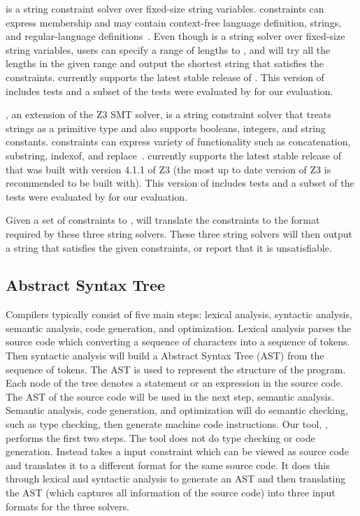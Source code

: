 \hampi is a string constraint solver over fixed-size string variables. \hampi constraints can express
membership and may contain context-free language definition, strings, and regular-language
definitions~\cite{hampi2009}. Even though \hampi is a string solver over fixed-size string variables,
users can specify a range of lengths to \hampi, and \hampi will try all the lengths in the given range
and output the shortest string that satisfies the constraints.
\imss currently supports the latest stable release of \hampi. This version of \hampi
includes \hampitests tests and a subset of the \hampitests tests were evaluated by \imss for our evaluation.

\zstr, an extension of the Z3 SMT solver, is a string constraint solver that treats strings
as a primitive type and also supports booleans, integers, and string constants.
\zstr constraints can express variety of functionality such as concatenation, substring,
indexof, and replace~\cite{z32013}.
\imss currently supports the latest stable release of \zstr that was built with version
4.1.1 of Z3 (the most up to date version of Z3 \zstr is recommended to be built with).
This version of \zstr
includes \ztests tests and a subset of the \ztests tests were evaluated by \imss for our evaluation.

Given a set of constraints to \imss, \imss will translate the constraints to the format required by these three string solvers. These three string solvers will then output a string that satisfies the given constraints, or report that it is unsatisfiable.

\subsection{Abstract Syntax Tree}
Compilers typically consist of five main steps: lexical analysis, syntactic analysis, semantic
analysis, code generation, and optimization. Lexical analysis parses the source code which converting
a sequence of characters into a sequence of tokens. Then syntactic analysis will build a
Abstract Syntax Tree (AST) from the sequence of tokens. The AST is used to represent the structure
of the program. Each node of the tree denotes a statement or an expression in the source code.
The AST of the source code will be used in the next step, semantic analysis.
Semantic analysis, code generation, and optimization will do semantic checking, such as type checking,
then generate machine code instructions. Our tool, \imss, performs the first two steps.
The tool does not do type checking or code generation. Instead \imss takes a input constraint which can be
viewed as source code and translates it to a different format for the same source code.
It does this through lexical and syntactic analysis to generate an AST and then translating the AST (which captures all information of the source code) into three input formats
for the three solvers.
